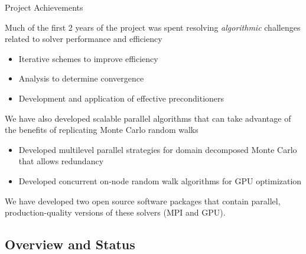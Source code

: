 \documentclass{beamer}
\begin{document}

\begin{frame}{Project Achievements}

  Much of the first 2 years of the project was spent resolving
  \textit{algorithmic} challenges related to solver performance and efficiency
  \begin{itemize}
  \item Iterative schemes to improve efficiency
  \item Analysis to determine convergence
  \item Development and application of effective preconditioners
  \end{itemize}

  \vfill

  We have also developed scalable parallel algorithms that can take advantage
  of the benefits of replicating Monte Carlo random walks
  \begin{itemize}
  \item Developed multilevel parallel strategies for domain decomposed Monte
    Carlo that allows redundancy
  \item Developed concurrent on-node random walk algorithms for GPU
    optimization
  \end{itemize}

  \vfill

  We have developed two open source software packages that contain
  parallel, production-quality versions of these solvers (MPI and GPU).

\end{frame}

\subsection{Overview and Status}
\end{document}
